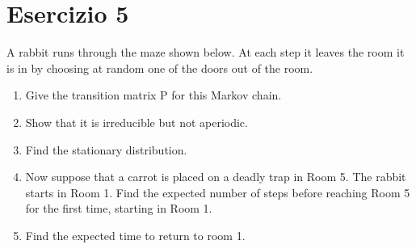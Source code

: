 \documentclass[
	12pt, %
]{fphw}
\begin{document}
\newpage
\section*{Esercizio 5}

\begin{problem}
	\smallskip
	A rabbit runs through the maze shown below. At each step it leaves
	the room it is in by choosing at random one of the doors out of the room.
	\begin{enumerate} 
		\item Give the transition matrix P for this Markov chain.
		\item Show that it is irreducible but not aperiodic.
		\item Find the stationary distribution.
		\item Now suppose that a carrot is placed on a deadly trap in Room
		5. The rabbit starts in Room 1. Find the expected number
		of steps before reaching Room 5 for the first time, starting in Room 1.
		\item Find the expected time to return to room 1.
	\end{enumerate}
	\smallskip
\end{problem}

\end{document}
